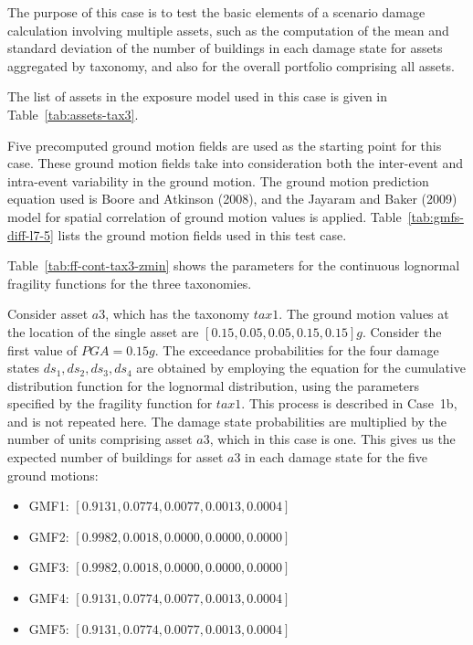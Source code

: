 The purpose of this case is to test the basic elements of a scenario damage calculation involving multiple assets, such as the computation of the mean and standard deviation of the number of buildings in each damage state for assets aggregated by taxonomy, and also for the overall portfolio comprising all assets.

The list of assets in the exposure model used in this case is given in Table~\ref{tab:assets-tax3}.

Five precomputed ground motion fields are used as the starting point for this case. These ground motion fields take into consideration both the inter-event and intra-event variability in the ground motion. The ground motion prediction equation used is Boore and Atkinson (2008), and the Jayaram and Baker (2009) model for spatial correlation of ground motion values is applied. Table~\ref{tab:gmfs-diff-l7-5} lists the ground motion fields used in this test case.



Table~\ref{tab:ff-cont-tax3-zmin} shows the parameters for the continuous lognormal fragility functions for the three taxonomies.

Consider asset $a3$, which has the taxonomy $tax1$.  The ground motion values at the location of the single asset are $[0.15, 0.05, 0.05, 0.15, 0.15] g$. Consider the first value of $PGA = 0.15 g$. The exceedance probabilities for the four damage states $ds_1, ds_2, ds_3, ds_4$ are obtained by employing the equation for the cumulative distribution function for the lognormal distribution, using the parameters specified by the fragility function for $tax1$. This process is described in Case~1b, and is not repeated here. The damage state probabilities are multiplied by the number of units comprising asset $a3$, which in this case is one. This gives us the expected number of buildings for asset $a3$ in each damage state for the five ground motions:

\begin{itemize}
	\item GMF1: $[0.9131, 0.0774, 0.0077, 0.0013, 0.0004]$
	\item GMF2: $[0.9982, 0.0018, 0.0000, 0.0000, 0.0000]$
	\item GMF3: $[0.9982, 0.0018, 0.0000, 0.0000, 0.0000]$
	\item GMF4: $[0.9131, 0.0774, 0.0077, 0.0013, 0.0004]$
	\item GMF5: $[0.9131, 0.0774, 0.0077, 0.0013, 0.0004]$
\end{itemize}

